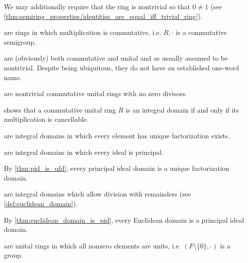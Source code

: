 \begin{definition}
\begin{defenum}
    We may additionally require that the ring is nontrivial so that \( 0 \neq 1 \) (see \cref{thm:semiring_properties/identities_are_equal_iff_trivial_ring}).

      are rings in which multiplication is commutative, i.e. \( R, \cdot \) is a commutative semigroup.

      are (obviously) both commutative and unital and as usually assumed to be nontrivial. Despite being ubiquitous, they do not have an established one-word name.

      are nontrivial commutative unital rings with no zero divisors.

     shows that a commutative unital ring \( R \) is an integral domain if and only if its multiplication is cancellable.

      are integral domains in which every element has unique factorization exists.

      are integral domains in which every ideal is principal.

    By \cref{thm:pid_is_ufd}, every principal ideal domain is a unique factorization domain.

      are integral domains which allow division with remainders (see \cref{def:euclidean_domain}).

    By \cref{thm:euclidean_domain_is_pid}, every Euclidean domain is a principal ideal domain.

      are unital rings in which all nonzero elements are units, i.e. \( (F \setminus \{ 0 \}, \cdot) \) is a group.


\end{defenum}
\end{definition}
